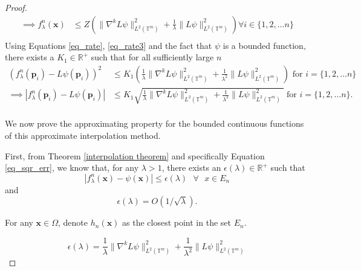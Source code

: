 \documentclass[multixcb]{amstext-l}
\theoremstyle{plain}
\theoremstyle{definition}
\theoremstyle{definition}
\theoremstyle{remark}
\numberwithin{equation}{chapter}
\begin{document}
\begin{proof}
\begin{equation}
\begin{aligned}
\implies f^n_{\lambda}(\boldsymbol{x}) &\le Z\left(\|\nabla^kL\psi\|_{L^2(\mathbb{T}^m)}^2 +\frac{1}{\lambda} \|L\psi\|_{L^2(\mathbb{T}^m)}^2\right) \forall i\in\{1,2,\ldots n\}\\
\end{aligned}
\end{equation}
Using Equations \ref{eq_rate}, \ref{eq_rate3} and the fact that $\psi$  is a bounded function, there exists a $K_1\in\mathbb{R}^+$ such that for all sufficiently large $n$
\begin{equation}\label{eq_rate4}\begin{aligned}
\left(f^n_{\lambda}(\boldsymbol{p}_i) -L\psi(\boldsymbol{p}_i) \right) ^2 &\le K_1\left(\frac{1}{\lambda}\|\nabla^kL\psi\|_{L^2(\mathbb{T}^m)}^2 +\frac{1}{\lambda^2} \|L\psi\|_{L^2(\mathbb{T}^m)}^2\right) \mbox{   for } i = \{1,2,\ldots n\} \\
\implies \left|f^n_{\lambda}(\boldsymbol{p}_i) -L\psi(\boldsymbol{p}_i) \right| &\le K_1\sqrt{\frac{1}{\lambda}\|\nabla^kL\psi\|_{L^2(\mathbb{T}^m)}^2 +\frac{1}{\lambda^2} \|L\psi\|_{L^2(\mathbb{T}^m)}^2} \mbox{   for } i = \{1,2,\ldots n\} .\\ 
\end{aligned}
\end{equation}
 
We now prove the approximating property for the bounded continuous functions of this approximate interpolation method.


First, from Theorem \ref{interpolation theorem} and specifically Equation \ref{eq_sqr_err}, we know that, for any $\lambda > 1$, there exists an $\epsilon(\lambda)\in\mathbb{R}^+$ such that \begin{equation}\label{first_condition}
    |f^n_{\lambda}(\boldsymbol{x})-\psi(\boldsymbol{x})|\le \epsilon(\lambda)\mbox{  } \forall \mbox{ }x\in E_n
\end{equation} and $$\epsilon(\lambda) = O(1/\sqrt{\lambda}).$$ 

For any $\boldsymbol{x}\in\Omega$, denote $h_n(\boldsymbol{x})$ as the closest point in the set $E_n$.

\begin{equation}\label{eq_denote}
\epsilon(\lambda) = \frac{1}{\lambda}\|\nabla^kL\psi\|_{L^2(\mathbb{T}^m)}^2 + \frac{1}{\lambda^2}\|L\psi\|_{L^2(\mathbb{T}^m)}^2 
\end{equation}


\end{proof}
\end{document}
